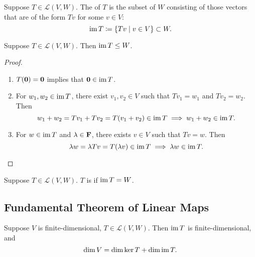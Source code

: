 \begin{definition}[Image]
Suppose $T\in\mathcal{L}(V,W)$. The  of $T$ is the subset of $W$ consisting of those vectors that are of the form $Tv$ for some $v\in V$:
\[\operatorname{im} T\coloneqq\{Tv\mid v\in V\}\subset W.\]
\end{definition}

\begin{proposition}
Suppose $T\in\mathcal{L}(V,W)$. Then $\operatorname{im} T\le W$.
\end{proposition}

\begin{proof} \
\begin{enumerate}[label=(\roman*)]
\item $T(\vb{0})=\vb{0}$ implies that $\vb{0}\in\operatorname{im} T$.
\item For $w_1,w_2\in\operatorname{im} T$, there exist $v_1,v_2\in V$ such that $Tv_1=w_1$ and $Tv_2=w_2$. Then
\[w_1+w_2=Tv_1+Tv_2=T(v_1+v_2)\in\operatorname{im} T\implies w_1+w_2\in\operatorname{im} T.\]
\item For $w\in\operatorname{im} T$ and $\lambda\in\mathbf F$, there exists $v\in V$ such that $Tv=w$. Then
\[\lambda w=\lambda Tv=T(\lambda v)\in\operatorname{im} T\implies\lambda w\in\operatorname{im} T.\]
\end{enumerate}
\end{proof}

\begin{definition}[Surjectivity]
Suppose $T\in\mathcal{L}(V,W)$. $T$ is  if $\operatorname{im} T=W$.
\end{definition}

\subsection{Fundamental Theorem of Linear Maps}
\begin{theorem}
Suppose $V$ is finite-dimensional, $T\in\mathcal{L}(V,W)$. Then $\operatorname{im} T$ is finite-dimensional, and
\begin{equation}
\dim V=\dim\ker T+\dim\operatorname{im} T.
\end{equation}
\end{theorem}

